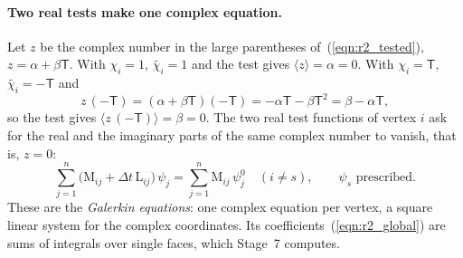 \paragraph{Two real tests make one complex equation.} Let $z$ be the complex number in the large parentheses of~(\ref{eqn:r2_tested}), $z = \alpha + \beta\mathsf T$. With $\chi_i = 1$, $\widetilde{\chi_i} = 1$ and the test gives $\langle z\rangle = \alpha = 0$. With $\chi_i = \mathsf T$, $\widetilde{\chi_i} = -\mathsf T$ and
\begin{equation*}
z\,(-\mathsf T) = (\alpha + \beta\mathsf T)(-\mathsf T) = -\alpha\mathsf T - \beta\mathsf T^2 = \beta - \alpha\mathsf T ,
\end{equation*}
so the test gives $\langle z\,(-\mathsf T)\rangle = \beta = 0$. The two real test functions of vertex $i$ ask for the real and the imaginary parts of the same complex number to vanish, that is, $z = 0$:
\begin{equation}
\label{eqn:r2_galerkin}
\sum_{j=1}^n \big(\mathrm M_{ij} + \Delta t\,\mathrm L_{ij}\big)\,\psi_j = \sum_{j=1}^n \mathrm M_{ij}\,\psi^0_j \quad (i \ne s), \qquad \psi_s \text{ prescribed} .
\end{equation}
These are the \emph{Galerkin equations}: one complex equation per vertex, a square linear system for the complex coordinates. Its coefficients~(\ref{eqn:r2_global}) are sums of integrals over single faces, which Stage~7 computes.

